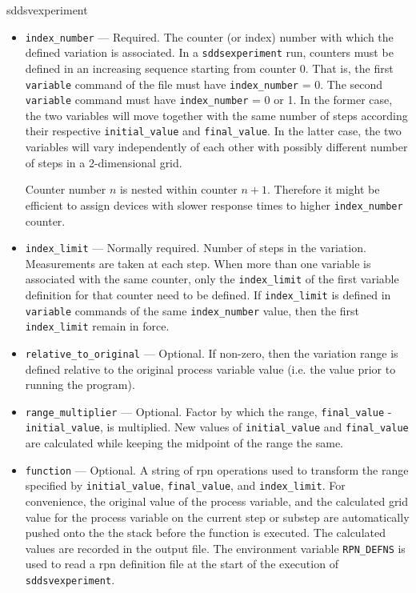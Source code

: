 \begin{sddsprog}{sddsvexperiment}
\begin{itemize}
\begin{itemize}
    \item {\verb+index_number+} --- Required. The counter (or index)
      number with which the defined variation is associated. In a
      \verb+sddsexperiment+ run, counters must be defined in an
      increasing sequence starting from counter 0. That is, the first
      {\verb+variable+} command of the file must have
      {\verb+index_number+} = 0. The second {\verb+variable+} command
      must have {\verb+index_number+} = 0 or 1. In the former case,
      the two variables will move together with the same number of
      steps according their respective {\verb+initial_value+} and
      {\verb+final_value+}. In the latter case, the two variables will
      vary independently of each other with possibly different number
      of steps in a 2-dimensional grid.

      Counter number $n$ is nested within counter $n+1$. Therefore it
      might be efficient to assign devices with slower response times
      to higher \verb+index_number+ counter.

    \item {\verb+index_limit+} --- Normally required.  Number of steps
      in the variation. Measurements are taken at each step.  When
      more than one variable is associated with the same counter, only
      the {\verb+index_limit+} of the first variable definition for
      that counter need to be defined.  If {\verb+index_limit+} is
      defined in {\verb+variable+} commands of the same
      {\verb+index_number+} value, then the first {\verb+index_limit+}
      remain in force.

    \item {\verb+relative_to_original+} --- Optional. If non-zero, then
      the variation range is defined relative to the original process
      variable value (i.e. the value prior to running the program).

    \item {\verb+range_multiplier+} --- Optional. Factor by which the
      range, {\verb+final_value+} - {\verb+initial_value+}, is
      multiplied.  New values of {\verb+initial_value+} and
      {\verb+final_value+} are calculated while keeping the midpoint
      of the range the same.

    \item {\verb+function+} --- Optional. A string of rpn operations
      used to transform the range specified by {\verb+initial_value+},
      {\verb+final_value+}, and {\verb+index_limit+}. For convenience,
      the original value of the process variable, and the calculated
      grid value for the process variable on the current step or
      substep are automatically pushed onto the the stack before the
      function is executed. The calculated values are recorded in the
      output file. The environment variable \verb+RPN_DEFNS+ is used
      to read a rpn definition file at the start of the execution of
      \verb+sddsvexperiment+.


\end{itemize}
\end{itemize}
\end{sddsprog}
